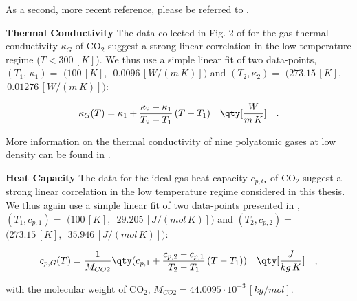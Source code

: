 As a second, more recent reference, please be referred to \cite{laesecke2017reference}.

\textbf{Thermal Conductivity}
The data collected in Fig. 2 of \cite{vesovic1990transport} for the gas thermal conductivity $\kappa_{G}$ of $\text{CO}_2$ suggest a strong linear correlation in the low temperature regime ($T<300\,[K]$). We thus use a simple linear fit of two data-points, $(T_1,\, \kappa_{1}) =$ $(100\,[K],$ $\,0.0096\,[W/(m\,K)])$ and $(T_2, \kappa_{2}) =$ $(273.15\,[K],$ $\,0.01276\, [W/(m\,K)])$:

\begin{equation}
   \kappa_{G}(T) =  \kappa_{1}+\frac{ \kappa_{2}- \kappa_{1}}{T_2-T_1}\,(T- T_1) \quad  \qty[\frac{W}{m\,K}]\quad .
\end{equation}

More information on the thermal conductivity of nine polyatomic gases at low density can be found in \cite{uribe1990thermal}.

\textbf{Heat Capacity}
The data for the ideal gas heat capacity $c_{p,G}$ of $\text{CO}_2$ suggest a strong linear correlation in the low temperature regime considered in this thesis. We thus again use a simple linear fit of two data-points presented in \cite{Woolley1954ThermodynamicFF}, $(T_1, c_{p,1}) =$ $(100\,[K],$ $\,29.205\,[J/(mol\,K)])$ and $(T_2, c_{p,2}) =$ $(273.15\,[K],$ $\,35.946\, [J/(mol\,K)])$:

\begin{equation}
    c_{p,G}(T) = \frac{1}{M_{CO2}}\qty(c_{p,1}+\frac{c_{p,2}-c_{p,1}}{T_2-T_1}\,(T- T_1))\quad  \qty[\frac{J}{kg\,K}]\quad ,
\end{equation}

with the molecular weight of $\text{CO}_2$,  $M_{CO2}=44.0095\cdot 10^{-3}\,[kg/mol]$.
